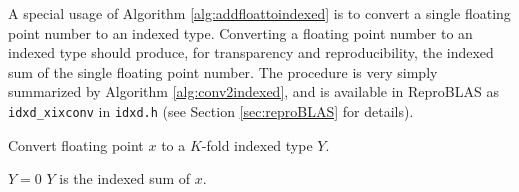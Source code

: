  A special usage of Algorithm \ref{alg:addfloattoindexed} is to convert a single floating point number to an indexed type. Converting a floating point number to an indexed type should produce, for
  transparency and reproducibility, the indexed sum of the single floating
  point number.
  The procedure is very simply summarized by Algorithm \ref{alg:conv2indexed}, and is available in ReproBLAS as \texttt{idxd\_xixconv} in \texttt{idxd.h} (see Section \ref{sec:reproBLAS} for details).

  \begin{samepage}
  \begin{alg}
    Convert floating point $x$ to a $K$-fold indexed type $Y$.
    \begin{algorithmic}[1]
        \State $Y = 0$
        \State {}
      \EndFunction
      \Ensure
        $Y$ is the indexed sum of $x$.
    \end{algorithmic}
    \label{alg:conv2indexed}
  \end{alg}
  \end{samepage}
